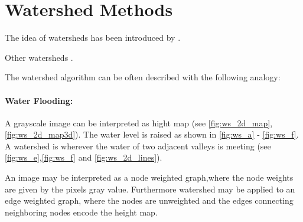 \section{Watershed Methods}\label{sec:rw_watershed_methods}



The idea of watersheds has been introduced by \citet{beucher_1979_workshop}.

Other watersheds \citep{vinent_1991_pami,najman_1994_sp,roerdink_2000_finf,bertrand_2005_jmiv,cousty_2009_pami}.


The watershed algorithm can be often described with the following analogy:

\paragraph{Water Flooding:} A grayscale  image can be interpreted as hight map (see \cref{fig:ws_2d_map}, \cref{fig:ws_2d_map3d}).
The water level is raised as shown in \cref{fig:ws_a} - \cref{fig:ws_f}.
A watershed is wherever the water of two adjacent valleys is meeting (see \cref{fig:ws_e},\cref{fig:ws_f} and \cref{fig:ws_2d_lines}).


An image may be interpreted as a node weighted graph,where the node weights
are given by the pixels gray value.
Furthermore  watershed may be applied to an edge weighted graph, where the nodes are unweighted 
and the edges connecting neighboring nodes encode the height map.


